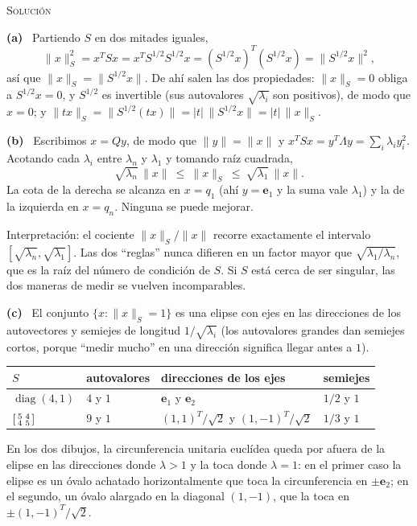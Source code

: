 \documentclass[11pt,a4paper]{article}
\newcommand{\bi}[1]{\boldsymbol{#1}}
\DeclareMathOperator{\diag}{diag}
\newcommand{\solucion}{\par\medskip\noindent\textsc{Solución}\par\nobreak\smallskip\noindent}
\newcommand{\itemsol}[1]{\par\medskip\noindent\textbf{(#1)}\ \ignorespaces}
\begin{document}
\solucion
\itemsol{a} Partiendo $S$ en dos mitades iguales,
\[
\|x\|_S^{2}=x^TSx=x^TS^{1/2}S^{1/2}x=(S^{1/2}x)^T(S^{1/2}x)=\|S^{1/2}x\|^{2},
\]
así que $\|x\|_S=\|S^{1/2}x\|$. De ahí salen las dos propiedades: $\|x\|_S=0$
obliga a $S^{1/2}x=0$, y $S^{1/2}$ es invertible (sus autovalores
$\sqrt{\lambda_i}$ son positivos), de modo que $x=0$; y
$\|tx\|_S=\|S^{1/2}(tx)\|=|t|\,\|S^{1/2}x\|=|t|\,\|x\|_S$.

\itemsol{b} Escribimos $x=Qy$, de modo que $\|y\|=\|x\|$ y
$x^TSx=y^T\Lambda y=\sum_i\lambda_iy_i^2$. Acotando cada $\lambda_i$ entre
$\lambda_n$ y $\lambda_1$ y tomando raíz cuadrada,
\[
\sqrt{\lambda_n}\,\|x\|\ \le\ \|x\|_S\ \le\ \sqrt{\lambda_1}\,\|x\| .
\]
La cota de la derecha se alcanza en $x=q_1$ (ahí $y=\bi{e}_1$ y la suma vale
$\lambda_1$) y la de la izquierda en $x=q_n$. Ninguna se puede mejorar.

Interpretación: el cociente $\|x\|_S/\|x\|$ recorre exactamente el intervalo
$[\sqrt{\lambda_n},\sqrt{\lambda_1}]$. Las dos ``reglas'' nunca difieren en un
factor mayor que $\sqrt{\lambda_1/\lambda_n}$, que es la raíz del número de
condición de $S$. Si $S$ está cerca de ser singular, las dos maneras de medir se
vuelven incomparables.

\itemsol{c} El conjunto $\{x:\|x\|_S=1\}$ es una elipse con ejes en las
direcciones de los autovectores y semiejes de longitud $1/\sqrt{\lambda_i}$ (los
autovalores grandes dan semiejes cortos, porque ``medir mucho'' en una dirección
significa llegar antes a $1$).
\begin{center}
\begin{tabular}{@{}llll@{}}
\hline
$S$ & autovalores & direcciones de los ejes & semiejes\\
\hline
$\diag(4,1)$ & $4$ y $1$ & $\bi{e}_1$ y $\bi{e}_2$ & $1/2$ y $1$\\
$\begin{bsmallmatrix}5&4\\4&5\end{bsmallmatrix}$ & $9$ y $1$ &
$(1,1)^T/\sqrt2$ y $(1,-1)^T/\sqrt2$ & $1/3$ y $1$\\
\hline
\end{tabular}
\end{center}
En los dos dibujos, la circunferencia unitaria euclídea queda por afuera de la
elipse en las direcciones donde $\lambda>1$ y la toca donde $\lambda=1$: en el
primer caso la elipse es un óvalo achatado horizontalmente que toca la
circunferencia en $\pm\bi{e}_2$; en el segundo, un óvalo alargado en la diagonal
$(1,-1)$, que la toca en $\pm(1,-1)^T/\sqrt2$.
\end{document}
